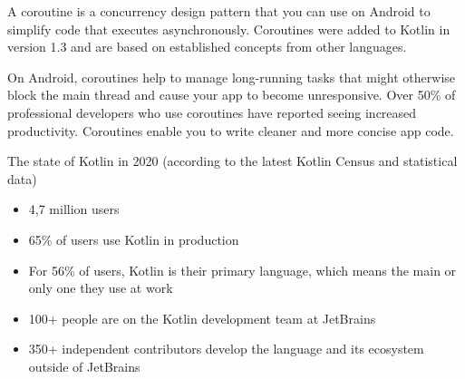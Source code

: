 A coroutine is a concurrency design pattern that you can use on Android to simplify code that executes asynchronously. Coroutines were added to Kotlin in version 1.3 and are based on established concepts from other languages.

On Android, coroutines help to manage long-running tasks that might otherwise block the main thread and cause your app to become unresponsive. Over 50\% of professional developers who use coroutines have reported seeing increased productivity. Coroutines enable you to write cleaner and more concise app code.

The state of Kotlin in 2020 (according to the latest Kotlin Census and statistical data)
\begin{itemize}
    \item 4,7 million users
    \item 65\% of users use Kotlin in production
    \item For 56\% of users, Kotlin is their primary language, which means the main or only
    one they use at work
    \item 100+ people are on the Kotlin development team at JetBrains
    \item 350+ independent contributors develop the language and its ecosystem outside
    of JetBrains
\end{itemize}

